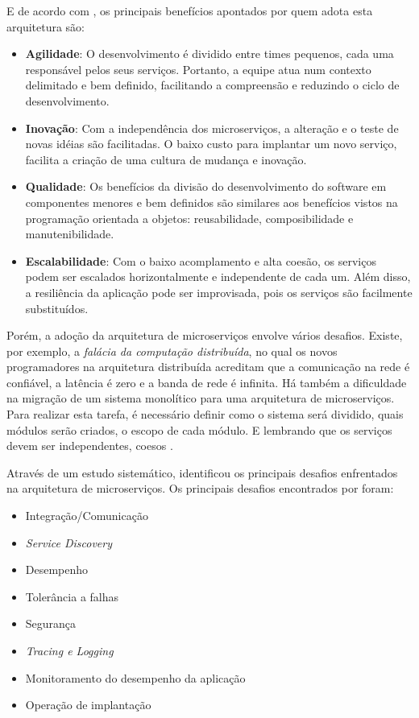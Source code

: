 \documentclass[12pt]{article}
\theoremstyle{plain}
\begin{document}
E de acordo com \cite{jung:2017}, os principais benefícios apontados por quem adota esta arquitetura são:
\begin{itemize}
    \item \textbf{Agilidade}: O desenvolvimento é dividido entre times pequenos, cada uma responsável pelos seus serviços. Portanto, a equipe atua num contexto delimitado e bem definido, facilitando a compreensão e reduzindo o ciclo de desenvolvimento. 
    \item \textbf{Inovação}: Com a independência dos microserviços, a alteração e o teste de novas idéias são facilitadas. O baixo custo para implantar um novo serviço, facilita a criação de uma cultura de mudança e inovação.
    \item \textbf{Qualidade}: Os benefícios da divisão do desenvolvimento do software em componentes menores e bem definidos são similares aos benefícios vistos na programação orientada a objetos: reusabilidade, composibilidade e manutenibilidade.
    \item \textbf{Escalabilidade}: Com o baixo acomplamento e alta coesão, os serviços podem ser escalados horizontalmente e independente de cada um. Além disso, a resiliência da aplicação pode ser improvisada, pois os serviços são facilmente substituídos.
\end{itemize}

Porém, a adoção da arquitetura de microserviços envolve vários desafios. Existe, por exemplo, a \textit{falácia da computação distribuída}, no qual os novos programadores na arquitetura distribuída acreditam que a comunicação na rede é confiável, a latência é zero e a banda de rede é infinita. Há também a dificuldade na migração de um sistema monolítico para uma arquitetura de microserviços. Para realizar esta tarefa, é necessário definir como o sistema será dividido, quais módulos serão criados, o escopo de cada módulo. E lembrando que os serviços devem ser independentes, coesos \cite{jung:2017}. 

Através de um estudo sistemático, \cite{Alshuqayran:2016} identificou os principais desafios enfrentados na arquitetura de microserviços. Os principais desafios encontrados por \cite{Alshuqayran:2016} foram:
\begin{itemize}
    \item Integração/Comunicação
    \item \textit{Service Discovery}
    \item Desempenho
    \item Tolerância a falhas
    \item Segurança
    \item \textit{Tracing e Logging}
    \item Monitoramento do desempenho da aplicação
    \item Operação de implantação
\end{itemize}
\end{document}
